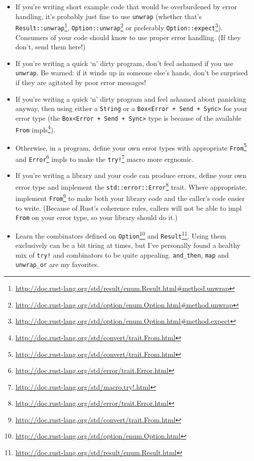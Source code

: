 \documentclass[a4paper,]{book}
\renewcommand{\href}[2]{#2\footnote{\url{#1}}}
\providecommand{\tightlist}{%
  \setlength{\itemsep}{0pt}\setlength{\parskip}{0pt}}
\begin{document}
\begin{itemize}
\tightlist
\item
  If you're writing short example code that would be overburdened by
  error handling, it's probably just fine to use \texttt{unwrap}
  (whether that's
  \href{http://doc.rust-lang.org/std/result/enum.Result.html\#method.unwrap}{\texttt{Result::unwrap}},
  \href{http://doc.rust-lang.org/std/option/enum.Option.html\#method.unwrap}{\texttt{Option::unwrap}}
  or preferably
  \href{http://doc.rust-lang.org/std/option/enum.Option.html\#method.expect}{\texttt{Option::expect}}).
  Consumers of your code should know to use proper error handling. (If
  they don't, send them here!)
\item
  If you're writing a quick `n' dirty program, don't feel ashamed if you
  use \texttt{unwrap}. Be warned: if it winds up in someone else's
  hands, don't be surprised if they are agitated by poor error messages!
\item
  If you're writing a quick `n' dirty program and feel ashamed about
  panicking anyway, then using either a \texttt{String} or a
  \texttt{Box\textless{}Error\ +\ Send\ +\ Sync\textgreater{}} for your
  error type (the
  \texttt{Box\textless{}Error\ +\ Send\ +\ Sync\textgreater{}} type is
  because of the
  \href{http://doc.rust-lang.org/std/convert/trait.From.html}{available
  \texttt{From} impls}).
\item
  Otherwise, in a program, define your own error types with appropriate
  \href{http://doc.rust-lang.org/std/convert/trait.From.html}{\texttt{From}}
  and
  \href{http://doc.rust-lang.org/std/error/trait.Error.html}{\texttt{Error}}
  impls to make the
  \href{http://doc.rust-lang.org/std/macro.try!.html}{\texttt{try!}}
  macro more ergnomic.
\item
  If you're writing a library and your code can produce errors, define
  your own error type and implement the
  \href{http://doc.rust-lang.org/std/error/trait.Error.html}{\texttt{std::error::Error}}
  trait. Where appropriate, implement
  \href{http://doc.rust-lang.org/std/convert/trait.From.html}{\texttt{From}}
  to make both your library code and the caller's code easier to write.
  (Because of Rust's coherence rules, callers will not be able to impl
  \texttt{From} on your error type, so your library should do it.)
\item
  Learn the combinators defined on
  \href{http://doc.rust-lang.org/std/option/enum.Option.html}{\texttt{Option}}
  and
  \href{http://doc.rust-lang.org/std/result/enum.Result.html}{\texttt{Result}}.
  Using them exclusively can be a bit tiring at times, but I've
  personally found a healthy mix of \texttt{try!} and combinators to be
  quite appealing. \texttt{and\_then}, \texttt{map} and
  \texttt{unwrap\_or} are my favorites.
\end{itemize}
\end{document}
